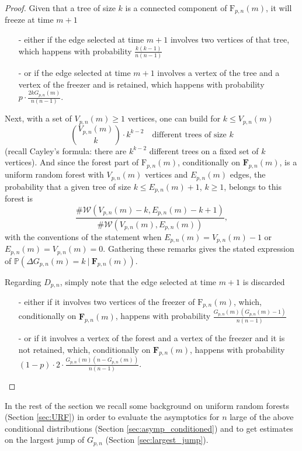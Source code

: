 \documentclass[a4, 11pt]{article}
\numberwithin{equation}{section}
\theoremstyle{plain}
\theoremstyle{definition}
\theoremstyle{remark}
\begin{document}
\begin{proof} Given that a tree of size $k$ is a connected component of $\mathrm{F}_{p,n}(m)$, it will freeze at time $m+1$ 
\begin{enumerate}[topsep=0pt]
	\item[-] either if the edge selected at time $m+1$ involves two vertices of that tree, which happens with probability $\frac{k(k-1)}{n(n-1)}$
	\item[-] or if the edge selected at time $m+1$ involves a vertex of the tree and a vertex of the freezer and is retained, which happens with probability $p \cdot \frac{2k G_{p,n}(m)}{n(n-1)}$.
\end{enumerate}
Next, with a set of $V_{p,n}(m) \geq 1$ vertices, one can build for $k\leq V_{p,n}(m)$ 
$$
\binom{V_{p,n}(m)}{k} \cdot k^{k-2} \quad \text{different trees of size $k$}
$$
(recall Cayley's formula: there are $k^{k-2}$ different trees on a fixed set of $k$ vertices). And since the forest part of $\mathrm{F}_{p,n}(m)$, conditionally on $\mathbf{F}_{p,n}(m)$, is a uniform random forest with $V_{p,n}(m)$ vertices and $E_{p,n}(m)$ edges, the probability that a given tree of size $k \leq E_{p,n}(m)+1$, $k\geq 1$, belongs to this forest is 
$$
\frac{\#\mathcal{W}(V_{p,n}(m)-k,E_{p,n}(m)-k+1)}{\#\mathcal{W}(V_{p,n}(m),E_{p,n}(m))},
$$
with the conventions of the statement when $E_{p,n}(m)=V_{p,n}(m)-1$ or $E_{p,n}(m)=V_{p,n}(m)=0$. Gathering these remarks gives the stated expression of $\mathbb{P}\left( \Delta G_{p,n}(m)=k ~| ~ \mathbf{F}_{p,n}(m)\right)$.

Regarding $D_{p,n}$, simply note that the edge selected at time $m+1$ is discarded
\begin{enumerate}[topsep=0pt]
	\item[-] either if it involves two vertices of the freezer of $\mathrm{F}_{p,n}(m)$, which, conditionally on $\mathbf{F}_{p,n}(m)$, happens with probability $\frac{G_{p,n}(m)\left(G_{p,n}(m)-1\right)}{n(n-1)}$
	\item[-] or if it involves a vertex of the forest and a vertex of the freezer and it is not retained, which,  conditionally on $\mathbf{F}_{p,n}(m)$, happens with probability $(1-p) \cdot 2 \cdot  \frac{G_{p,n}(m)\left(n-G_{p,n}(m)\right)}{n(n-1)}$.
\end{enumerate}
\end{proof}

\smallskip

In the rest of the section we recall some background on uniform random forests (Section \ref{sec:URF}) in order to evaluate the asymptotics for $n$ large of the above conditional distributions (Section \ref{sec:asymp_conditioned}) and to get estimates on the largest jump of $G_{p,n}$ (Section \ref{sec:largest_jump}).
\end{document}
